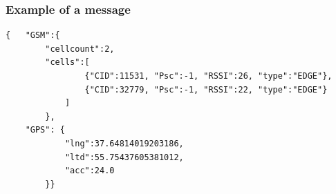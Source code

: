 \documentclass{beamer}
\begin{document}


\begin{frame}[fragile]
	\frametitle{Example of a message}
	\begin{lstlisting}
{	"GSM":{
		"cellcount":2, 
		"cells":[
				{"CID":11531, "Psc":-1, "RSSI":26, "type":"EDGE"}, 
				{"CID":32779, "Psc":-1, "RSSI":22, "type":"EDGE"}
			]
		},
	"GPS": {
			"lng":37.64814019203186,
			"ltd":55.75437605381012,
			"acc":24.0
		}}
	\end{lstlisting}
\end{frame}

\end{document}
